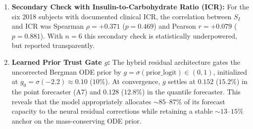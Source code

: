 \documentclass[journal]{IEEEtran}
\begin{document}
\begin{enumerate}
    \item \textbf{Secondary Check with Insulin-to-Carbohydrate Ratio (ICR):} For the six 2018 subjects with documented clinical ICR, the correlation between $S_I$ and ICR was Spearman $\rho = +0.371$ ($p = 0.469$) and Pearson $r = +0.079$ ($p = 0.881$). With $n=6$ this secondary check is statistically underpowered, but reported transparently.
    \item \textbf{Learned Prior Trust Gate $g$:} The hybrid residual architecture gates the uncorrected Bergman ODE prior by $g = \sigma(\text{prior\_logit}) \in (0, 1)$, initialized at $g_0 = \sigma(-2.2) \approx 0.10$ ($10\%$). At convergence, $g$ settles at $0.152$ ($15.2\%$) in the point forecaster (A7) and $0.128$ ($12.8\%$) in the quantile forecaster. This reveals that the model appropriately allocates $\sim 85\text{--}87\%$ of its forecast capacity to the neural residual corrections while retaining a stable $\sim 13\text{--}15\%$ anchor on the mass-conserving ODE prior.
\end{enumerate}
\end{document}

